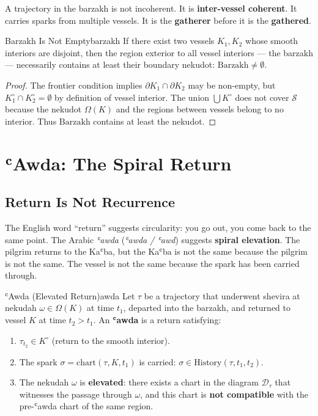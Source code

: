 \documentclass[11pt,a4paper]{article}
\begin{document}
A trajectory in the barzakh is not incoherent. It is \textbf{inter-vessel coherent}. It carries sparks from multiple vessels. It is the \textbf{gatherer} before it is the \textbf{gathered}.

\begin{thmbox}{Barzakh Is Not Empty}{barzakh}
If there exist two vessels $K_1, K_2$ whose smooth interiors are disjoint, then the region exterior to all vessel interiors --- the barzakh --- necessarily contains at least their boundary nekudot: $\mathrm{Barzakh} \neq \emptyset$.
\end{thmbox}
\begin{proof}
The frontier condition implies $\partial K_1 \cap \partial K_2$ may be non-empty, but $K_1^{\circ} \cap K_2^{\circ} = \emptyset$ by definition of vessel interior. The union $\bigcup K^{\circ}$ does not cover $\mathcal{S}$ because the nekudot $\Omega(K)$ and the regions between vessels belong to no interior. Thus $\mathrm{Barzakh}$ contains at least the nekudot.
\end{proof}

\section{ʿAwda: The Spiral Return}
\label{sec:awda}

\subsection{Return Is Not Recurrence}

The English word ``return'' suggests circularity: you go out, you come back to the same point. The Arabic \emph{ʿawda} (\emph{ʿawda / ʿawd}) suggests \textbf{spiral elevation}. The pilgrim returns to the Kaʿba, but the Kaʿba is not the same because the pilgrim is not the same. The vessel is not the same because the spark has been carried through.

\begin{defbox}{ʿAwda (Elevated Return)}{awda}
Let $\tau$ be a trajectory that underwent shevira at nekudah $\omega \in \Omega(K)$ at time $t_1$, departed into the barzakh, and returned to vessel $K$ at time $t_2 > t_1$. An \textbf{ʿawda} is a return satisfying:
\begin{enumerate}
    \item $\tau_{t_2} \in K^{\circ}$ (return to the smooth interior).
    \item The spark $\sigma = \mathrm{chart}(\tau, K, t_1)$ is carried: $\sigma \in \mathrm{History}(\tau, t_1, t_2)$.
    \item The nekudah $\omega$ is \textbf{elevated}: there exists a chart in the diagram $\mathcal{D}_\tau$ that witnesses the passage through $\omega$, and this chart is \textbf{not compatible} with the pre-ʿawda chart of the same region.
\end{enumerate}
\end{defbox}
\end{document}
